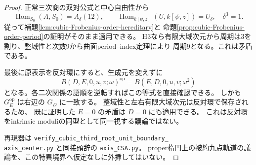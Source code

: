 \begin{proof}
正常三次商の双対公式と中心自由性から
\[
 \operatorname{Hom}_{S_0}(A,S_0)=A_\delta(12),\qquad
 \operatorname{Hom}_{k[\psi,z]}(U,k[\psi,z])=U_\delta,\quad\delta^3=1.
\]
従って補題\ref{lem:cubic-Frobenius-order-hereditary}と
命題\ref{prop:cubic-Frobenius-order-period}の証明がそのまま適用できる。
H3なら有限大域次元から周期は3を割り、整域性と次数9から曲面period--index定理により
周期9となる。これは矛盾である。

最後に原表示を反対環にすると、生成元を変えずに
\[
 B(D,E,0,u,v;\omega)^{\mathrm{op}}
   =B(E,D,0,u,v;\omega^2)
\]
となる。各二次関係の語順を逆転すればこの等式を直接確認できる。
しかも $G_E^{\mathrm{op}}$ は右辺の $G_D$ に一致する。
整域性と左右有限大域次元は反対環で保存されるため、
既に証明した $E=0$ の矛盾は $D=0$ にも適用できる。
これは反対環をintrinsic moduliの同型として同一視する議論ではない。

再現器は \texttt{verify\_cubic\_third\_root\_unit\_boundary\_}\\
\texttt{axis\_center.py} と同接頭辞の \texttt{axis\_CSA.py}。
proper楕円上の被約九点軌道の議論を、この特異境界へ仮定なしに外挿してはいない。
\end{proof}
